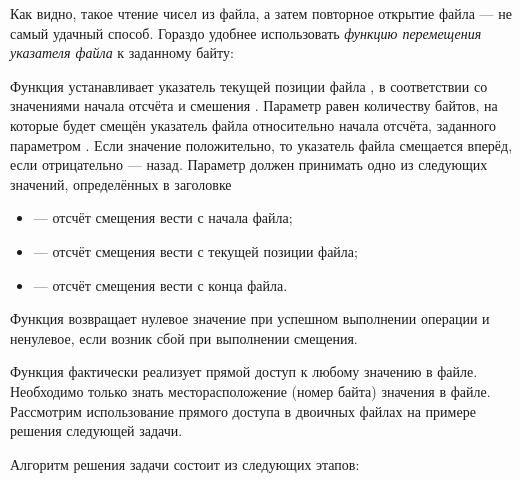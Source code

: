 Как видно, такое чтение чисел из файла, а затем повторное открытие файла --- не самый удачный способ. Гораздо удобнее
использовать \emph{функцию перемещения указателя файла} к заданному байту:


Функция устанавливает указатель текущей позиции файла , в соответствии со значениями начала отсчёта
 и смешения . Параметр  равен количеству
байтов, на которые будет смещён указатель файла относительно начала отсчёта, заданного параметром
. Если значение  положительно, то указатель файла смещается вперёд,
если отрицательно --- назад. Параметр  должен принимать одно из следующих значений, 
определённых в заголовке 
\begin{itemize}
\item[]  --- отсчёт смещения  вести с начала файла;
\item[]  --- отсчёт смещения  вести с текущей позиции файла;
\item[]  --- отсчёт смещения  вести с конца файла.
\end{itemize}
Функция возвращает нулевое значение при успешном выполнении операции и ненулевое, если возник сбой при выполнении
смещения.

Функция  фактически реализует прямой доступ к любому значению в файле. Необходимо только знать
месторасположение (номер байта) значения в файле. Рассмотрим использование прямого доступа в двоичных файлах на примере
решения следующей задачи.


Алгоритм решения задачи состоит из следующих этапов:

